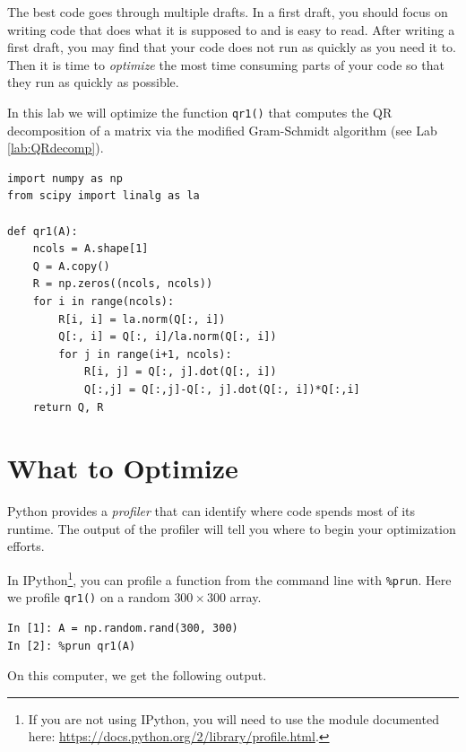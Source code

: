 \label{lab:ProfilingCode}

The best code goes through multiple drafts.
In a first draft, you should focus on writing code that does what it is supposed to and is easy to read.
After writing a first draft, you may find that your code does not run as quickly as you need it to.
Then it is time to \emph{optimize} the most time consuming parts of your code so that they run as quickly as possible.

In this lab we will optimize the function \texttt{qr1()} that computes the QR decomposition of a matrix via the modified Gram-Schmidt algorithm (see Lab \ref{lab:QRdecomp}).
\begin{lstlisting}
import numpy as np
from scipy import linalg as la

def qr1(A):
    ncols = A.shape[1]
    Q = A.copy()
    R = np.zeros((ncols, ncols))
    for i in range(ncols):
        R[i, i] = la.norm(Q[:, i])
        Q[:, i] = Q[:, i]/la.norm(Q[:, i])
        for j in range(i+1, ncols):
            R[i, j] = Q[:, j].dot(Q[:, i])
            Q[:,j] = Q[:,j]-Q[:, j].dot(Q[:, i])*Q[:,i]
    return Q, R
\end{lstlisting}

\section*{What to Optimize}
Python provides a \emph{profiler} that can identify where code spends most of its runtime.
The output of the profiler will tell you where to begin your optimization efforts.

In IPython\footnote{If you are not using IPython, you will need to use the  module documented here: \url{https://docs.python.org/2/library/profile.html}.}, 
you can profile a function from the command line with \texttt{\%prun}.
Here we profile \texttt{qr1()} on a random $300 \times 300$ array.
\begin{lstlisting}
In [1]: A = np.random.rand(300, 300)
In [2]: %prun qr1(A)
\end{lstlisting}

On this computer, we get the following output.

